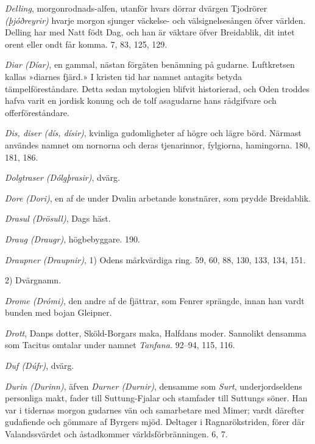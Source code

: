 \protect\hypertarget{lb1625905.xhtmlux5cux23start210}{}{}\protect\hypertarget{lb1625905.xhtmlux5cux23start210-a}{}{}\protect\hypertarget{lb1625905.xhtmlux5cux23start210-b}{}{}\protect\hypertarget{lb1625905.xhtmlux5cux23start210-c}{}{}\protect\hypertarget{lb1625905.xhtmlux5cux23start210-d}{}{}

\emph{Delling}, morgonrodnads-alfen, utanför hvars dörrar dvärgen
Tjodrörer \emph{(þjóðreyrir)} hvarje morgon sjunger väckelse- och
välsignelsesången öfver världen. Delling har med Natt födt Dag, och han
är väktare öfver Breidablik, dit intet orent eller ondt får komma. 7,
83, 125, 129.

\emph{Diar (Díar)}, en gammal, nästan förgäten benämning på gudarne.
Luftkretsen kallas »diarnes fjärd.» I kristen tid har namnet antagits
betyda tämpelföreståndare. Detta sedan mytologien blifvit historierad,
och Oden troddes hafva varit en jordisk konung och de tolf asagudarne
hans rådgifvare och offerföreståndare.

\emph{Dis, diser (dís, dísir)}, kvinliga gudomligheter af högre och
lägre börd. Närmast användes namnet om nornorna och deras tjenarinnor,
fylgiorna, hamingorna. 180, 181, 186.

\emph{Dolgtraser (Dólgþrasir)}, dvärg.

\emph{Dore (Dori)}, en af de under Dvalin arbetande konstnärer, som
prydde Breidablik.

\emph{Drasul (Drösull)}, Dags häst.

\emph{Draug (Draugr)}, högbebyggare. 190.

\emph{Draupner (Draupnir)}, 1) Odens märkvärdiga ring. 59, 60, 88, 130,
133, 134, 151.

2) Dvärgnamn.

\emph{Drome (Drómi)}, den andre af de fjättrar, som Fenrer sprängde,
innan han vardt bunden med bojan Gleipner.

\emph{Drott}, Danps dotter, Sköld-Borgars maka, Halfdans moder.
Sannolikt densamma som Tacitus omtalar under namnet \emph{Tanfana.}
92--94, 115, 116.

\emph{Duf (Dúfr)}, dvärg.

\emph{Durin (Durinn)}, äfven \emph{Durner (Durnir)}, densamme som
\emph{Surt}, underjordseldens personliga makt, fader till Suttung-Fjalar
och stamfader till Suttungs söner. Han var i tidernas morgon gudarnes
vän och samarbetare med Mimer; vardt därefter gudafiende och gömmare af
Byrgers mjöd. Deltager i Ragnarökstriden, förer där Valandssvärdet och
åstadkommer världsförbränningen. 6, 7.

